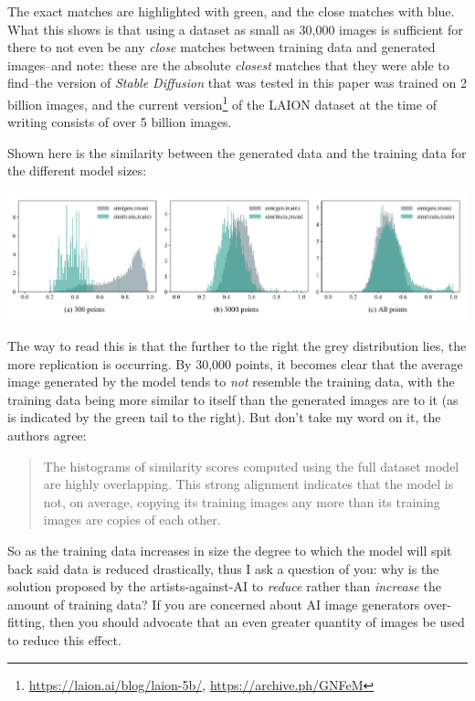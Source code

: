 \documentclass[11pt]{article}
\begin{document}
The exact matches are highlighted with green, and the close matches with blue. What this shows is that using a dataset as small as 30,000 images is sufficient for there to not even be any \emph{close} matches between training data and generated images--and note: these are the absolute \emph{closest} matches that they were able to find--the version of \emph{Stable Diffusion} that was tested in this paper was trained on 2 billion images, and the current version\footnote{\url{https://laion.ai/blog/laion-5b/}, \url{https://archive.ph/GNFeM}} of the LAION dataset at the time of writing consists of over 5 billion images.

Shown here is the similarity between the generated data and the training data for the different model sizes:
\begin{center}
\includegraphics[width=.9\linewidth]{./images/replication-histograms.png}
\end{center}

The way to read this is that the further to the right the grey distribution lies, the more replication is occurring. By 30,000 points, it becomes clear that the average image generated by the model tends to \emph{not} resemble the training data, with the training data being more similar to itself than the generated images are to it (as is indicated by the green tail to the right). But don't take my word on it, the authors agree:
\begin{quote}
The histograms of similarity scores computed using the full dataset model are highly overlapping. This strong alignment indicates that the model is not, on average, copying its training images any more than its training images are copies of each other.
\end{quote}

So as the training data increases in size the degree to which the model will spit back said data is reduced drastically, thus I ask a question of you: why is the solution proposed by the artists-against-AI to \emph{reduce} rather than \emph{increase} the amount of training data? If you are concerned about AI image generators over-fitting, then you should advocate that an even greater quantity of images be used to reduce this effect.
\end{document}
